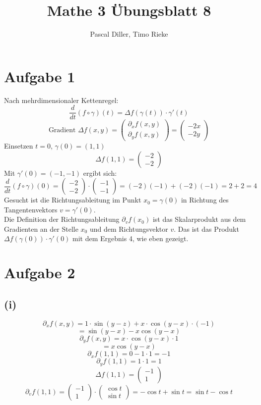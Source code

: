 \documentclass{article}
\title{Mathe 3 Übungsblatt 8}
\author{Pascal Diller, Timo Rieke}
\date{}
\begin{document}
\maketitle

\section*{Aufgabe 1}
Nach mehrdimensionaler Kettenregel:
\[\frac{d}{dt}(f \circ \gamma)(t) = \Delta f(\gamma (t)) \cdot \gamma ' (t)\]
\[\text{Gradient }\Delta f(x,y) = \begin{pmatrix} \partial_xf(x,y) \\ \partial_yf(x,y) \end{pmatrix} = \begin{pmatrix} -2x \\ -2y \end{pmatrix} \]
Einsetzen $t = 0$, $\gamma(0) = (1,1)$
\[\Delta f(1,1) = \begin{pmatrix} -2 \\ -2 \end{pmatrix}\]
Mit $\gamma '(0) = (-1, -1)$ ergibt sich:
\[\frac{d}{dt} (f \circ \gamma) (0) = \begin{pmatrix}
    -2 \\ -2
\end{pmatrix} \cdot \begin{pmatrix}
    -1 \\ -1
\end{pmatrix} = (-2)(-1) + (-2)(-1) = 2 + 2 = 4\]
Gesucht ist die Richtungsableitung im Punkt $x_0 = \gamma(0)$ in Richtung des Tangentenvektors $v = \gamma'(0)$. \\
Die Definition der Richtungsableitung $\partial_v f(x_0)$ ist das Skalarprodukt aus dem Gradienten an der Stelle $x_0$ und dem Richtungsvektor $v$. Das ist das Produkt $\Delta f (\gamma(0)) \cdot \gamma'(0)$ mit dem Ergebnis 4, wie eben gezeigt.

\section*{Aufgabe 2}
\subsection*{(i)}
\[\partial_x f(x,y) = 1 \cdot \sin (y - z) + x \cdot \cos(y-x) \cdot (-1) \] 
\[= \sin(y-x) - x \cos (y-x)\]
\[\partial_y f(x,y) = x \cdot \cos(y-x) \cdot 1 \] 
\[= x \cos (y-x)\]
\[\partial_x f(1,1) = 0 -1 \cdot 1 = -1\]
\[\partial_y f(1,1) = 1 \cdot 1 = 1\]
\[\Delta f (1,1) = \begin{pmatrix}
    -1 \\ 1
\end{pmatrix}\]
\[\partial_v f(1,1) = \begin{pmatrix}
    -1 \\ 1
\end{pmatrix} \cdot \begin{pmatrix}
    \cos t \\ \sin t
\end{pmatrix} = - \cos t + \sin t = \sin t - \cos t \]
\end{document}
